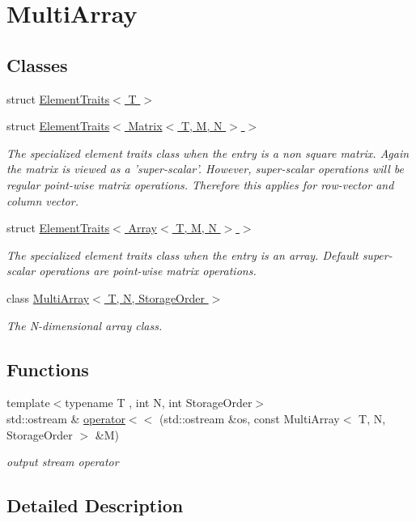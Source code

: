 \hypertarget{group___multi_array}{\section{Multi\-Array}
\label{group___multi_array}
}
\subsection*{Classes}
\begin{DoxyCompactItemize}
\item 
struct \hyperlink{struct_d_o_1_1_element_traits}{Element\-Traits$<$ T $>$}
\item 
struct \hyperlink{struct_d_o_1_1_element_traits_3_01_matrix_3_01_t_00_01_m_00_01_n_01_4_01_4}{Element\-Traits$<$ Matrix$<$ T, M, N $>$ $>$}
\begin{DoxyCompactList}\small\item\em The specialized element traits class when the entry is a non square matrix. Again the matrix is viewed as a 'super-\/scalar'. However, super-\/scalar operations will be regular point-\/wise matrix operations. Therefore this applies for row-\/vector and column vector. \end{DoxyCompactList}\item 
struct \hyperlink{struct_d_o_1_1_element_traits_3_01_array_3_01_t_00_01_m_00_01_n_01_4_01_4}{Element\-Traits$<$ Array$<$ T, M, N $>$ $>$}
\begin{DoxyCompactList}\small\item\em The specialized element traits class when the entry is an array. Default super-\/scalar operations are point-\/wise matrix operations. \end{DoxyCompactList}\item 
class \hyperlink{class_d_o_1_1_multi_array}{Multi\-Array$<$ T, N, Storage\-Order $>$}
\begin{DoxyCompactList}\small\item\em The N-\/dimensional array class. \end{DoxyCompactList}\end{DoxyCompactItemize}
\subsection*{Functions}
\begin{DoxyCompactItemize}
\item 
\hypertarget{group___multi_array_ga9223155c64483239f48caab75fc0557d}{{\footnotesize template$<$typename T , int N, int Storage\-Order$>$ }\\std\-::ostream \& \hyperlink{group___multi_array_ga9223155c64483239f48caab75fc0557d}{operator$<$$<$} (std\-::ostream \&os, const Multi\-Array$<$ T, N, Storage\-Order $>$ \&M)}\label{group___multi_array_ga9223155c64483239f48caab75fc0557d}

\begin{DoxyCompactList}\small\item\em output stream operator \end{DoxyCompactList}\end{DoxyCompactItemize}


\subsection{Detailed Description}
